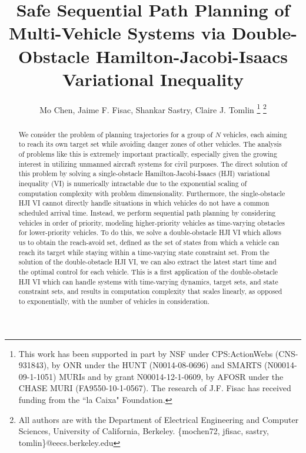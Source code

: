 \documentclass[letterpaper, 10pt, conference]{ieeeconf}      %
\title{\LARGE \bf
Safe Sequential Path Planning of Multi-Vehicle Systems via Double-Obstacle Hamilton-Jacobi-Isaacs Variational Inequality}
\author{Mo Chen, Jaime F. Fisac, Shankar Sastry, Claire J. Tomlin
\thanks{This work has been supported in part by NSF under CPS:ActionWebs (CNS-931843), by ONR under the HUNT (N0014-08-0696) and SMARTS (N00014-09-1-1051) MURIs and by grant N00014-12-1-0609, by AFOSR under the CHASE MURI (FA9550-10-1-0567). The research of J.F. Fisac has received funding from the ``la Caixa" Foundation.}
\thanks{All authors are with the Department of Electrical Engineering and Computer Sciences, University of California, Berkeley. \{mochen72, jfisac, sastry, tomlin\}@eecs.berkeley.edu}
}
\begin{document}
\maketitle
\thispagestyle{empty}
\pagestyle{empty}

\begin{abstract}
We consider the problem of planning trajectories for a group of $N$ vehicles, each aiming to reach its own target set while avoiding danger zones of other vehicles. The analysis of problems like this is extremely important practically, especially given the growing interest in utilizing unmanned aircraft systems for civil purposes. The direct solution of this problem by solving a single-obstacle Hamilton-Jacobi-Isaacs (HJI) variational inequality (VI) is numerically intractable due to the exponential scaling of computation complexity with problem dimensionality. Furthermore, the single-obstacle HJI VI cannot directly handle situations in which vehicles do not have a common scheduled arrival time. Instead, we perform sequential path planning  by considering vehicles in order of priority, modeling higher-priority vehicles as time-varying obstacles for lower-priority vehicles. To do this, we solve a double-obstacle HJI VI which allows us to obtain the reach-avoid set, defined as the set of states from which a vehicle can reach its target while staying within a time-varying state constraint set. From the solution of the double-obstacle HJI VI, we can also extract the latest start time and the optimal control for each vehicle. This is a first application of the double-obstacle HJI VI which can handle systems with time-varying dynamics, target sets, and state constraint sets, and results in computation complexity that scales linearly, as opposed to exponentially, with the number of vehicles in consideration.
\end{abstract}

% 
\end{document}
